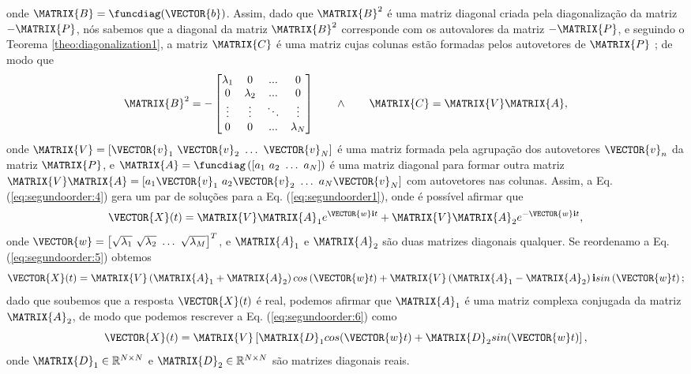 \begin{myproofT}
onde $\MATRIX{B}=\funcdiag(\VECTOR{b})$. 
Assim, dado que $\MATRIX{B}^2$ é uma matriz diagonal criada pela diagonalização da  
matriz $-\MATRIX{P}$, nós sabemos que
a diagonal da matriz $\MATRIX{B}^2$ corresponde com os autovalores da matriz $-\MATRIX{P}$,
e seguindo o Teorema \ref{theo:diagonalization1}, a matriz $\MATRIX{C}$ é uma matriz cujas colunas estão formadas pelos 
autovetores de $\MATRIX{P}$ \cite[pp. 67]{golub2013matrix}; de modo que
\begin{equation}\label{eq:segundoorder:4}
\MATRIX{B}^2=-
\begin{bmatrix}
\lambda_1 & 0         & ...    & 0 \\
0         & \lambda_2 & ...    & 0 \\
\vdots    & \vdots    & \ddots & \vdots \\
0         & 0         & ...    & \lambda_N
\end{bmatrix}
\qquad \wedge \qquad \MATRIX{C}=\MATRIX{V}\MATRIX{A}, 
\end{equation}
onde $\MATRIX{V}=\left[ \VECTOR{v}_1~  \VECTOR{v}_2~  \dots~ \VECTOR{v}_N\right]$ 
é uma matriz formada pela agrupação dos autovetores $\VECTOR{v}_n$ da matriz $\MATRIX{P}$,
e $\MATRIX{A}=\funcdiag\left(\left[ a_1~  a_2~  \dots~ a_N\right]\right)$ 
é uma matriz diagonal para formar outra matriz  
$\MATRIX{V}\MATRIX{A}=\left[ a_1\VECTOR{v}_1~  a_2\VECTOR{v}_2~  \dots~ a_N\VECTOR{v}_N\right]$
com autovetores nas colunas.
Assim, a Eq. (\ref{eq:segundoorder:4}) gera um par de soluções para a Eq. (\ref{eq:segundoorder1}),
onde é possível afirmar que
\begin{equation}\label{eq:segundoorder:5}
\VECTOR{X}(t)=\MATRIX{V}\MATRIX{A}_1 e^{\VECTOR{w} \mathbf{i} t}+ \MATRIX{V}\MATRIX{A}_2 e^{-\VECTOR{w} \mathbf{i} t},
\end{equation}
onde $\VECTOR{w}=\left[ \sqrt{\lambda_1}~ \sqrt{\lambda_2}~ \dots~ \sqrt{\lambda_M}\right]^{T}$, 
e $\MATRIX{A}_1$ e $\MATRIX{A}_2$ são duas matrizes diagonais qualquer.
Se reordenamo a Eq. (\ref{eq:segundoorder:5}) obtemos
\begin{equation}\label{eq:segundoorder:6}
\VECTOR{X}(t)=
\MATRIX{V}\left(\MATRIX{A}_1+\MATRIX{A}_2\right) cos\left(\VECTOR{w}  t\right)+ 
\MATRIX{V}\left(\MATRIX{A}_1-\MATRIX{A}_2\right) \mathbf{i} sin\left(\VECTOR{w}  t\right);
\end{equation}
dado que soubemos que a resposta $\VECTOR{X}(t)$ é real, 
podemos afirmar que $\MATRIX{A}_1$ é uma matriz complexa conjugada da matriz $\MATRIX{A}_2$,
de modo que podemos rescrever a Eq. (\ref{eq:segundoorder:6}) como
\begin{equation}\label{eq:segundoorder:7}
 \VECTOR{X}(t)= \MATRIX{V}\left[\MATRIX{D}_1 cos(\VECTOR{w}t) + \MATRIX{D}_2 sin(\VECTOR{w}t) \right],
\end{equation}
onde $\MATRIX{D}_1 \in \mathbb{R}^{N\times N}$ e $\MATRIX{D}_2 \in \mathbb{R}^{N\times N}$ 
são matrizes diagonais reais. 
\end{myproofT}
